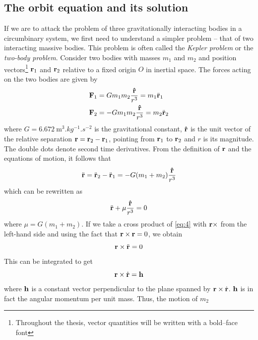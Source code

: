 \documentclass[twoside,openright,titlepage,numbers=noenddot,headinclude,%
                footinclude=true,cleardoublepage=empty,abstractoff, 
                BCOR=5mm,paper=a4,fontsize=11pt,%
                american,%
                ]{scrreprt}%
\begin{document}
\subsection{The orbit equation and its solution}
If we are to attack the problem of three gravitationally interacting
bodies in a circumbinary system, we first need to understand a simpler 
problem -- that of two interacting massive bodies. This problem is often called 
the \emph{Kepler problem} or the \emph{two-body problem}. Consider two bodies with masses
$m_1$ and $m_2$ and position vectors\footnote{Throughout the thesis,
vector quantities will be written with a bold--face font}
$\boldsymbol{\mathbf{r}}_1$ and $\boldsymbol{\mathbf{r}}_2$ relative to a fixed origin $O$ in
inertial space. The forces acting on the two bodies are given by
\begin{align}
    \boldsymbol{\mathbf{F}}_1 &= Gm_1m_2 \frac{\boldsymbol{\mathbf{\hat{r}}}}{r^3} = m_1\ddot{\boldsymbol{\mathbf{r}}}_1\\
    \boldsymbol{\mathbf{F}}_2 &= -Gm_1m_2 \frac{\boldsymbol{\mathbf{\hat{r}}}}{r^3}= m_2\ddot{\boldsymbol{\mathbf{r}}}_2
\end{align}
where $G=\SI{6.672}{\meter^3.kg^{-1}.s^{-2}}$ is the gravitational constant,
$\boldsymbol{\mathbf{\hat{r}}}$ is the unit vector of the relative separation
$\boldsymbol{\mathbf{r}}=\boldsymbol{\mathbf{r}}_2 - \boldsymbol{\mathbf{r}}_1$, pointing from $\boldsymbol{\mathbf{r}}_1$ to $\boldsymbol{\mathbf{r}}_2$
and $r$ is its magnitude. 
The double dots denote second time derivatives. From the definition of $\boldsymbol{\mathbf{r}}$ 
and the equations of motion, it follows that
\begin{equation}
    \ddot{\boldsymbol{\mathbf{r}}}=\ddot{\boldsymbol{\mathbf{r}}}_2 - \ddot{\boldsymbol{\mathbf{r}}}_1=-G(m_1+m_2)
    \frac{\boldsymbol{\mathbf{\hat{r}}}}{r^3} \\
\end{equation}
which can be rewritten as
\begin{equation}
    \ddot{\boldsymbol{\mathbf{r}}} + \mu \frac{\boldsymbol{\mathbf{\hat{r}}}}{r^3} =0 \label{eq:4}
\end{equation}
where $\mu=G(m_1+m_2)$. If we take a cross product of \cref{eq:4} with
$\boldsymbol{\mathbf{r}}\times$ from the left-hand side and using the fact that 
$\boldsymbol{\mathbf{r}}\times\boldsymbol{\mathbf{r}}=0$, we obtain
\begin{equation}
\boldsymbol{\mathbf{r}}\times\ddot{\boldsymbol{\mathbf{r}}}=0
\end{equation}
This can be integrated to get
\begin{equation}
    \boldsymbol{\mathbf{r}}\times\dot{\boldsymbol{\mathbf{r}}}=\boldsymbol{\mathbf{h}}
    \label{eq:6}
\end{equation}
where $\boldsymbol{\mathbf{h}}$ is a constant vector perpendicular to the plane spanned 
by $\boldsymbol{\mathbf{r}}\times\dot{\boldsymbol{\mathbf{r}}}$. $\boldsymbol{\mathbf{h}}$ is in fact the angular momentum
per unit mass. Thus, the motion of $m_2$
\end{document}
